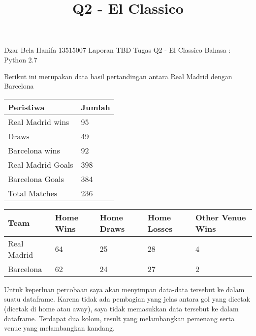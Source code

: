 \documentclass[11pt]{article}
\title{Q2 - El Classico}
\begin{document}
    
    
    \maketitle
    
    

    
    Dzar Bela Hanifa 13515007 Laporan TBD Tugas Q2 - El Classico Bahasa :
Python 2.7

    Berikut ini merupakan data hasil pertandingan antara Real Madrid dengan
Barcelona

\begin{longtable}[]{@{}ll@{}}
\toprule
Peristiwa & Jumlah\tabularnewline
\midrule
\endhead
Real Madrid wins & 95\tabularnewline
Draws & 49\tabularnewline
Barcelona wins & 92\tabularnewline
Real Madrid Goals & 398\tabularnewline
Barcelona Goals & 384\tabularnewline
Total Matches & 236\tabularnewline
\bottomrule
\end{longtable}

\begin{longtable}[]{@{}lllll@{}}
\toprule
Team & Home Wins & Home Draws & Home Losses & Other Venue
Wins\tabularnewline
\midrule
\endhead
Real Madrid & 64 & 25 & 28 & 4\tabularnewline
Barcelona & 62 & 24 & 27 & 2\tabularnewline
\bottomrule
\end{longtable}

Untuk keperluan percobaan saya akan menyimpan data-data tersebut ke
dalam suatu dataframe. Karena tidak ada pembagian yang jelas antara gol
yang dicetak (dicetak di home atau away), saya tidak memasukkan data
tersebut ke dalam dataframe. Terdapat dua kolom, result yang
melambangkan pemenang serta venue yang melambangkan kandang.
\end{document}
